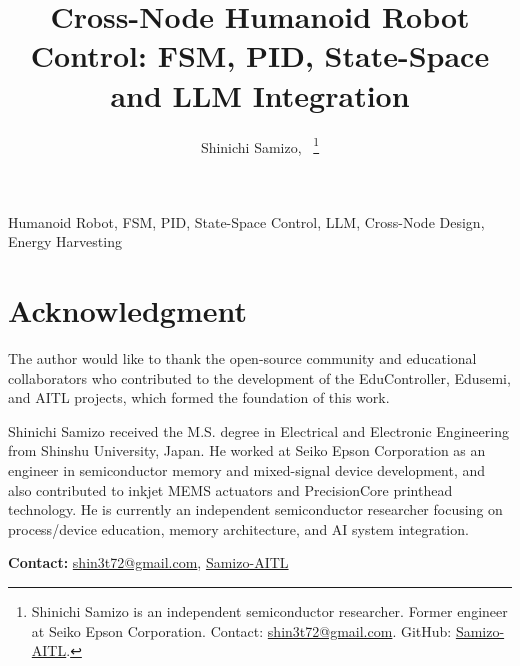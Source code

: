\documentclass[journal]{IEEEtran}
\begin{document}
\title{Cross-Node Humanoid Robot Control: FSM, PID, State-Space and LLM Integration}

\author{Shinichi Samizo,~%
\thanks{Shinichi Samizo is an independent semiconductor researcher. 
Former engineer at Seiko Epson Corporation. 
Contact: \href{mailto:shin3t72@gmail.com}{shin3t72@gmail.com}. 
GitHub: \href{https://github.com/Samizo-AITL}{Samizo-AITL}.}
}

\maketitle


\begin{IEEEkeywords}
Humanoid Robot, FSM, PID, State-Space Control, LLM, Cross-Node Design, Energy Harvesting
\end{IEEEkeywords}








\section*{Acknowledgment}
The author would like to thank the open-source community and educational collaborators 
who contributed to the development of the EduController, Edusemi, and AITL projects, 
which formed the foundation of this work.




\vspace{-0.5\baselineskip}
\begingroup\small
\begin{IEEEbiographynophoto}{Shinichi Samizo}
received the M.S. degree in Electrical and Electronic Engineering from Shinshu University, Japan.
He worked at Seiko Epson Corporation as an engineer in semiconductor memory and mixed-signal device development, and also contributed to inkjet MEMS actuators and PrecisionCore printhead technology.
He is currently an independent semiconductor researcher focusing on process/device education, memory architecture, and AI system integration.

\textbf{Contact:} \href{mailto:shin3t72@gmail.com}{shin3t72@gmail.com},
\href{https://github.com/Samizo-AITL}{Samizo-AITL}
\end{IEEEbiographynophoto}
\endgroup
\end{document}
